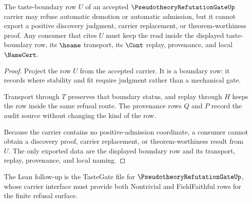 \begin{theorem}
\label{thm:pseudotheory-refutation-gate-taste-boundary-nonescape}
The taste-boundary row $U$ of an accepted $\PseudotheoryRefutationGateUp$ carrier may refuse automatic demotion or automatic admission, but it cannot export a positive discovery judgment, carrier replacement, or theorem-worthiness proof. Any consumer that cites $U$ must keep the read inside the displayed taste-boundary row, its $\hsame$ transport, its $\Cont$ replay, provenance, and local $\NameCert$.
\end{theorem}
\begin{proof}
Project the row $U$ from the accepted carrier. It is a boundary row: it records where stability and fit require judgment rather than a mechanical gate.

Transport through $T$ preserves that boundary status, and replay through $H$ keeps the row inside the same refusal route. The provenance rows $Q$ and $P$ record the audit source without changing the kind of the row.

Because the carrier contains no positive-admission coordinate, a consumer cannot obtain a discovery proof, carrier replacement, or theorem-worthiness result from $U$. The only exported data are the displayed boundary row and its transport, replay, provenance, and local naming.
\end{proof}



The Lean follow-up is the TasteGate file for $\PseudotheoryRefutationGateUp$, whose carrier interface must provide both Nontrivial and FieldFaithful rows for the finite refusal surface.


